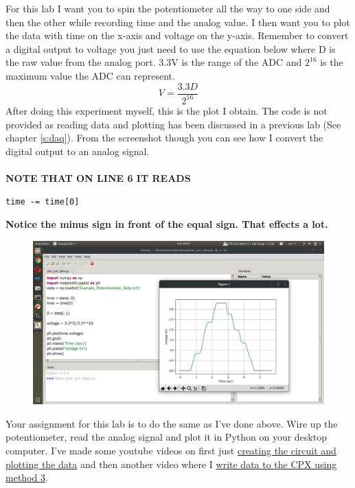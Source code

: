 For this lab I want you to spin the potentiometer all the way to one side and then the other while recording time and the analog value. I then want you to plot the data with time on the x-axis and voltage on the y-axis. Remember to convert a digital output to voltage you just need to use the equation below where D is the raw value from the analog port. 3.3V is the range of the ADC and $2^{16}$ is the maximum value the ADC can represent.
\begin{equation}
V = \frac{3.3D}{2^{16}}
\end{equation}
After doing this experiment myself, this is the plot I obtain. The code is not provided as reading data and plotting has been discussed in a previous lab (See chapter \ref{s:daq}). From the screenshot though you can see how I convert the digital output to an analog signal.
\ \\
\ \\
{\bf NOTE THAT ON LINE 6 IT READS}
\begin{verbatim}
time -= time[0]
\end{verbatim}
{\bf Notice the minus sign in front of the equal sign. That effects a lot.}
\begin{figure}[H]
  \begin{center}
    \includegraphics[width=\textwidth]{Figures/plotting_analogio.png}
  \end{center}
\end{figure}
Your assignment for this lab is to do the same as I’ve done above. Wire up the potentiometer, read the analog signal and plot it in Python on your desktop computer. I’ve made some youtube videos on first just \href{https://youtu.be/_gnDvPOvPqk}{creating the circuit and plotting the data} and then another video where I \href{https://youtu.be/9UF3OVUIYjU}{write data to the CPX using method 3}.

